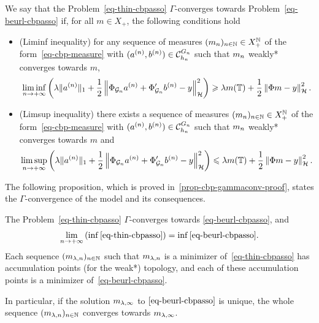 \begin{defn}
  We say that the Problem~\eqref{eq-thin-cbpasso} $\Gamma$-converges towards Problem~\eqref{eq-beurl-cbpasso} if, for all $m\in X_+$, the following conditions hold
  \begin{itemize}
    \item{(Liminf inequality)} for any sequence of measures $(m_n)_{n\in\mathbb{N}}\in X_+^{\mathbb{N}}$ of the form~\eqref{eq-cbp-measure} with $(a^{(n)},b^{(n)})\in \mathcal{C}_{h_n}^{G_n}$ such that $m_n$ weakly* converges towards $m$, 
      \begin{align*}
        \liminf_{n\to +\infty}\left(\lambda \|a^{(n)}\|_1+\frac{1}{2}\left\lVert \Phi_{\mathcal{G}_n}a^{(n)}+\Phi'_{\mathcal{G}_n}b^{(n)}-y \right\rVert_{\mathcal{H}}^2\right) \geqslant \lambda m(\mathbb{T}) + \frac{1}{2}\left\lVert \Phi m-y \right\rVert_{\mathcal{H}}^2.
      \end{align*}
    \item{(Limsup inequality)} there exists a sequence of measures $(m_n)_{n\in \mathbb{N}}\in X_+^{\mathbb{N}}$ of the form~\eqref{eq-cbp-measure} with $(a^{(n)},b^{(n)})\in \mathcal{C}_{h_n}^{G_n}$ such that $m_n$ weakly* converges towards $m$  and
      \begin{align*}
        \limsup_{n\to +\infty}\left(\lambda \|a^{(n)}\|_1+\frac{1}{2}\left\lVert \Phi_{\mathcal{G}_n}a^{(n)}+\Phi'_{\mathcal{G}_n}b^{(n)}-y \right\rVert_{\mathcal{H}}^2\right)\leqslant \lambda m(\mathbb{T}) + \frac{1}{2}\left\lVert \Phi m-y \right\rVert_{\mathcal{H}}^2.
      \end{align*}
  \end{itemize}
  \label{def-gammacv-cbp}
\end{defn}

The following proposition, which is proved in~\ref{prop-cbp-gammaconv-proof}, states the $\Gamma$-convergence of the model and its consequences.

\begin{prop}\label{prop-cbp-gammaconv}
  The Problem~\eqref{eq-thin-cbpasso} $\Gamma$-converges towards \eqref{eq-beurl-cbpasso}, and 
\begin{align}
  \lim_{n\to +\infty}\left(\inf \eqref{eq-thin-cbpasso}\right) = \inf \eqref{eq-beurl-cbpasso}.\label{eq-cvinf-cbpasso}
\end{align}
Each sequence $(m_{\lambda,n})_{n\in\mathbb{N}}$ such that $m_{\lambda,n}$ is a minimizer of~\eqref{eq-thin-cbpasso} has accumulation points (for the weak*) topology, and each of these accumulation points is a minimizer of~\eqref{eq-beurl-cbpasso}.
\label{prop-cbpthin-convergence}
\end{prop}
In particular, if the solution $m_{\lambda,\infty}$ to $\eqref{eq-beurl-cbpasso}$ is unique, the whole sequence $(m_{\lambda,n})_{n\in\mathbb{N}}$ converges towards $m_{\lambda,\infty}$.

